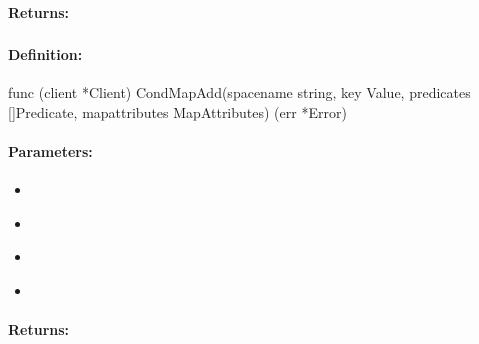 \paragraph{Returns:}


\pagebreak
\subsubsection{}
\label{api:Go:CondMapAdd}


\paragraph{Definition:}
\begin{gocode}
func (client *Client) CondMapAdd(spacename string, key Value, predicates []Predicate, mapattributes MapAttributes) (err *Error)
\end{gocode}

\paragraph{Parameters:}
\begin{itemize}[noitemsep]
\item {}\\

\item {}\\

\item {}\\

\item {}\\

\end{itemize}

\paragraph{Returns:}


\pagebreak
\subsubsection{}
\label{api:Go:MapRemove}


